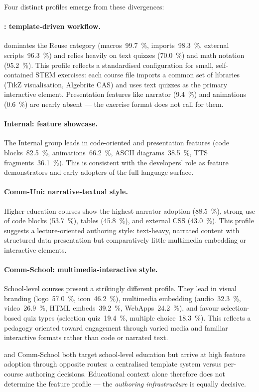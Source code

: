 Four distinct profiles emerge from these divergences:

\paragraph{\mintgroup: template-driven workflow.}
\mintgroup{} dominates the Reuse category (macros~\SI{99.7}{\percent},
imports~\SI{98.3}{\percent}, external scripts~\SI{96.3}{\percent})
and relies heavily on text quizzes (\SI{70.0}{\percent}) and
math notation (\SI{95.2}{\percent}).
This profile reflects a standardised configuration for small,
self-contained STEM exercises: each course file imports a common set
of libraries (TikZ visualisation, Algebrite CAS) and uses text quizzes
as the primary interactive element.
Presentation features like narrator (\SI{9.4}{\percent}) and
animations (\SI{0.6}{\percent}) are nearly absent --- the exercise
format does not call for them.

\paragraph{Internal: feature showcase.}
The Internal group leads in code-oriented and presentation features
(code blocks~\SI{82.5}{\percent}, animations~\SI{66.2}{\percent},
ASCII diagrams~\SI{38.5}{\percent}, TTS fragments~\SI{36.1}{\percent}).
This is consistent with the developers' role as feature demonstrators and
early adopters of the full language surface.

\paragraph{Comm-Uni: narrative-textual style.}
Higher-education courses show the highest narrator adoption
(\SI{88.5}{\percent}), strong use of code blocks (\SI{53.7}{\percent}),
tables (\SI{45.8}{\percent}), and external CSS (\SI{43.0}{\percent}).
This profile suggests a lecture-oriented authoring style:
text-heavy, narrated content with structured data presentation
but comparatively little multimedia embedding or interactive elements.

\paragraph{Comm-School: multimedia-interactive style.}
School-level courses present a strikingly different profile.
They lead in visual branding (logo~\SI{57.0}{\percent},
icon~\SI{46.2}{\percent}), multimedia embedding
(audio~\SI{32.3}{\percent}, video~\SI{26.9}{\percent},
HTML embeds~\SI{39.2}{\percent}, WebApps~\SI{24.2}{\percent}),
and favour selection-based quiz types
(selection quiz~\SI{19.4}{\percent}, multiple choice~\SI{18.3}{\percent}).
This reflects a pedagogy oriented toward engagement through
varied media and familiar interactive formats rather than code or
narrated text.

\mintgroup{} and Comm-School both target school-level education but
arrive at high feature adoption through opposite routes: a centralised
template system versus per-course authoring decisions.
Educational context alone therefore does not determine the feature
profile --- the \emph{authoring infrastructure} is equally decisive.
